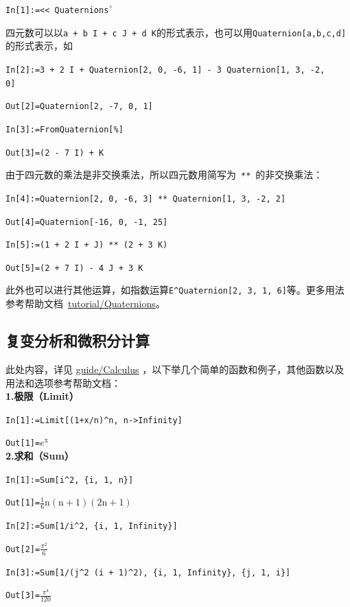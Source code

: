 \documentclass[UTF8,a4paper,10pt]{ctexart}
\begin{document}
\verb|In[1]:=<< Quaternions`|   

四元数可以以\verb|a + b I + c J + d K|的形式表示，也可以用\verb|Quaternion[a,b,c,d]|的形式表示，如

\verb|In[2]:=3 + 2 I + Quaternion[2, 0, -6, 1] - 3 Quaternion[1, 3, -2, 0]|   

\verb|Out[2]=Quaternion[2, -7, 0, 1]|  

\verb|In[3]:=FromQuaternion[%]|   

\verb|Out[3]=(2 - 7 I) + K|   

由于四元数的乘法是非交换乘法，所以四元数用简写为~\verb|**|~的非交换乘法：

\verb|In[4]:=Quaternion[2, 0, -6, 3] ** Quaternion[1, 3, -2, 2]|   

\verb|Out[4]=Quaternion[-16, 0, -1, 25]|   

\verb|In[5]:=(1 + 2 I + J) ** (2 + 3 K)|

\verb|Out[5]=(2 + 7 I) - 4 J + 3 K|   

此外也可以进行其他运算，如指数运算\verb|E^Quaternion[2, 3, 1, 6]|等。更多用法参考帮助文档~\href{http://reference.wolfram.com/language/Quaternions/tutorial/Quaternions.html}{tutorial/Quaternions}。



\subsection{复变分析和微积分计算}

此处内容，详见
\href{http://reference.wolfram.com/language/guide/Calculus.html}{guide/Calculus}
，以下举几个简单的函数和例子，其他函数以及
用法和选项参考帮助文档：
\\

\textbf{1.极限（Limit）}

\verb|In[1]:=Limit[(1+x/n)^n, n->Infinity]|

\verb|Out[1]=|$e^\text{x}$
\\

\textbf{2.求和（Sum）}

\verb|In[1]:=Sum[i^2, {i, 1, n}]|

\verb|Out[1]=|$\frac{1}{6} \text{n} (\text{n}+1) (2 \text{n}+1)$

\verb|In[2]:=Sum[1/i^2, {i, 1, Infinity}]|

\verb|Out[2]=|$\frac{\pi ^2}{6}$

\verb|In[3]:=Sum[1/(j^2 (i + 1)^2), {i, 1, Infinity}, {j, 1, i}]|

\verb|Out[3]=|$\frac{\pi ^4}{120}$
\\
\end{document}
